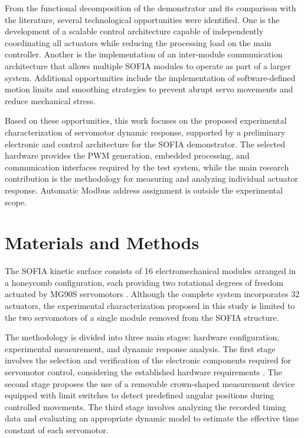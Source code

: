\documentclass[lettersize,journal]{IEEEtran}
\begin{document}
	From the functional decomposition of the demonstrator and its comparison with
	the literature, several technological opportunities were identified. One is
	the development of a scalable control architecture capable of independently
	coordinating all actuators while reducing the processing load on the main
	controller. Another is the implementation of an inter-module communication
	architecture that allows multiple SOFIA modules to operate as part of a larger
	system. Additional opportunities include the implementation of
	software-defined motion limits and smoothing strategies to prevent abrupt
	servo movements and reduce mechanical stress.
	
	Based on these opportunities, this work focuses on the proposed experimental
	characterization of servomotor dynamic response, supported by a preliminary
	electronic and control architecture for the SOFIA demonstrator. The selected
	hardware provides the PWM generation, embedded processing, and communication
	interfaces required by the test system, while the main research contribution
	is the methodology for measuring and analyzing individual actuator response.
	Automatic Modbus address assignment is outside the experimental scope.
	
	
	\section{Materials and Methods}
	\label{sec:methods}
	
	The SOFIA kinetic surface consists of 16 electromechanical modules arranged in a honeycomb configuration, each providing two rotational degrees of freedom actuated by MG90S servomotors \cite{sofia_architecture,mg90s}. Although the complete system incorporates 32 actuators, the experimental characterization proposed in this study is limited to the two servomotors of a single module removed from the SOFIA structure.
	
	The methodology is divided into three main stages: hardware configuration, experimental measurement, and dynamic response analysis. The first stage involves the selection and verification of the electronic components required for servomotor control, considering the established hardware requirements \cite{technical_session}. The second stage proposes the use of a removable crown-shaped measurement device equipped with limit switches to detect predefined angular positions during controlled movements. The third stage involves analyzing the recorded timing data and evaluating an appropriate dynamic model to estimate the effective time constant of each servomotor.
	
\end{document}
